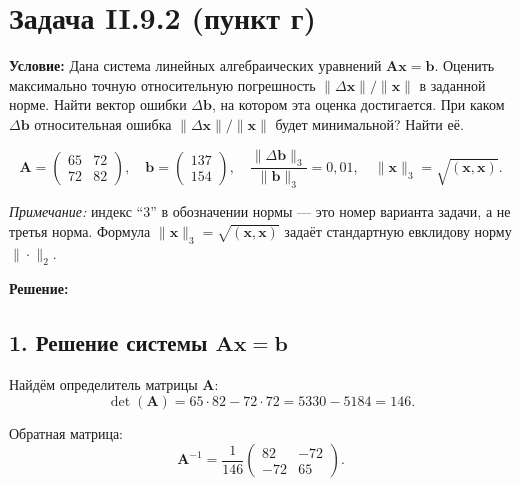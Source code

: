 \documentclass{article}
\begin{document}
\section*{Задача II.9.2 (пункт г)}

\textbf{Условие:} Дана система линейных алгебраических уравнений $\mathbf{A}\mathbf{x} = \mathbf{b}$. Оценить максимально точную относительную погрешность $\|\Delta\mathbf{x}\|/\|\mathbf{x}\|$ в заданной норме. Найти вектор ошибки $\Delta\mathbf{b}$, на котором эта оценка достигается. При каком $\Delta\mathbf{b}$ относительная ошибка $\|\Delta\mathbf{x}\|/\|\mathbf{x}\|$ будет минимальной? Найти её.

$$
\mathbf{A} = \begin{pmatrix} 65 & 72 \\ 72 & 82 \end{pmatrix}, \quad 
\mathbf{b} = \begin{pmatrix} 137 \\ 154 \end{pmatrix}, \quad 
\frac{\|\Delta\mathbf{b}\|_3}{\|\mathbf{b}\|_3} = 0{,}01, \quad 
\|\mathbf{x}\|_3 = \sqrt{(\mathbf{x}, \mathbf{x})}.
$$

\textit{Примечание:} индекс ``3'' в обозначении нормы --- это номер варианта задачи, а не третья норма. Формула $\|\mathbf{x}\|_3 = \sqrt{(\mathbf{x}, \mathbf{x})}$ задаёт стандартную евклидову норму $\|\cdot\|_2$.

\vspace{0.5cm}
\textbf{Решение:}

\subsection*{1. Решение системы $\mathbf{A}\mathbf{x} = \mathbf{b}$}

Найдём определитель матрицы $\mathbf{A}$:
\begin{equation}
\det(\mathbf{A}) = 65 \cdot 82 - 72 \cdot 72 = 5330 - 5184 = 146.
\end{equation}

Обратная матрица:
\begin{equation}
\mathbf{A}^{-1} = \frac{1}{146} \begin{pmatrix} 82 & -72 \\ -72 & 65 \end{pmatrix}.
\end{equation}
\end{document}
